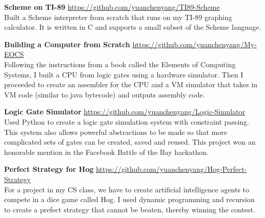 \documentclass[9pt]{article}
\newenvironment{changemargin}[2]{%
  \begin{list}{}{%
      \setlength{\topsep}{0pt}%
      \setlength{\leftmargin}{#1}%
      \setlength{\rightmargin}{#2}%
      \setlength{\listparindent}{\parindent}%
      \setlength{\itemindent}{\parindent}%
      \setlength{\parsep}{\parskip}%
    }%
  \item[]}{\end{list}
}
\newenvironment{body} {
  \vspace*{-16pt}
  \begin{changemargin}{-0.25in}{-0.5in}
  }
  {\end{changemargin}
}
\begin{document}
\begin{body}
  \textbf{Scheme on TI-89} \hfill \url{https://github.com/yuanchenyang/TI89-Scheme}\\
  Built a Scheme interpreter from scratch that runs on my TI-89 graphing calculator. It is written in C and supports a small subset of the Scheme language.\\
  \medskip

  \textbf{Building a Computer from Scratch} \hfill \url{https://github.com/yuanchenyang/My-EOCS}\\
  Following the instructions from a book called the Elements of Computing Systems, I built a CPU from logic gates using a hardware simulator. Then I proceeded to create an assembler for the CPU and a VM simulator that takes in VM code (similar to java bytecode) and outputs assembly code. \\
  \medskip

 \textbf{Logic Gate Simulator} \hfill \url{https://github.com/yuanchenyang/Logic-Simulator}\\
 Used Python to create a logic gate simulation system with constraint passing. This system also allows powerful abstractions to be made so that more complicated sets of gates can be created, saved and reused. This project won an honorable mention in the Facebook Battle of the Bay hackathon.\\
   \medskip

   \textbf{Perfect Strategy for Hog} \hfill \url{https://github.com/yuanchenyang/Hog-Perfect-Strategy}\\
   For a project in my CS class, we have to create artificial intelligence agents to compete in a dice game called Hog. I used dynamic programming and recursion to create a prefect strategy that cannot be beaten, thereby winning the contest. \\
   \medskip
\end{body}

\smallskip

\end{document}
